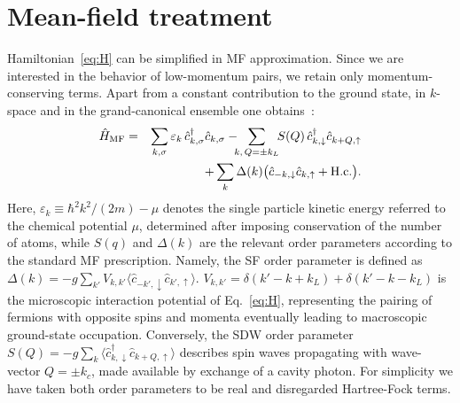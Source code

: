 \documentclass[pra,aps,superscriptaddress,twocolumn]{revtex4}
\begin{document}
\section{Mean-field treatment}\label{sec:MF}
Hamiltonian~\eqref{eq:H} can be simplified in MF approximation.
Since we are interested in the behavior of low-momentum pairs, we retain only
momentum-conserving terms.
Apart from a constant contribution to the ground state, in $k$-space and in the grand-canonical ensemble
one obtains~\cite{GardinerZoller, Guo2012, refnoteHelmut}:
\begin{eqnarray}
\hat H_{\rm MF} & = & \sum_{k, \sigma} \varepsilon_k \, \hat c_{k,\sigma}^\dagger \hat c_{k,\sigma} 
   - \!\!\! \sum_{k, \, Q= \pm k_L} \!\! S(Q) \, \hat c_{k,\downarrow}^{\dagger} \hat c_{k+Q,\uparrow}^{} \nonumber \\
&& +\sum_{k}\Delta(k)\big( \hat c_{-k,\downarrow}\hat c_{k,\uparrow}+ {\rm H.c.} \big) .
  \label{eq:Ham_MF}
\end{eqnarray}
Here, $\varepsilon_{k}\equiv \hbar^2 k^2/(2m)-\mu$ denotes the single particle kinetic energy referred
to the chemical potential $\mu$, determined after imposing conservation of the number of atoms,
while $S(q)$ and $\Delta(k)$ are the relevant order parameters according to the standard MF prescription.
Namely, the SF order parameter is defined as $\Delta(k)=-g\sum_{k'}V_{k, k'} \langle \hat c_{- k',\downarrow}\hat c_{k',\uparrow}\rangle$.
$V_{k, k'}=\delta(k'- k+k_L)+\delta(k'- k - k_L )$ is the microscopic interaction potential of Eq.~\eqref{eq:H},
representing the pairing of fermions with opposite spins and momenta eventually leading to macroscopic
ground-state occupation. Conversely, the SDW order parameter
$S(Q)=-g\sum_k \langle \hat c_{k,\downarrow}^{\dagger}\hat c_{k+Q,\uparrow}^{}\rangle$
describes spin waves propagating with wave-vector $Q=\pm k_c$,
made available by exchange of a cavity photon.
For simplicity we have taken both order parameters to be real
and disregarded Hartree-Fock terms.
\end{document}
